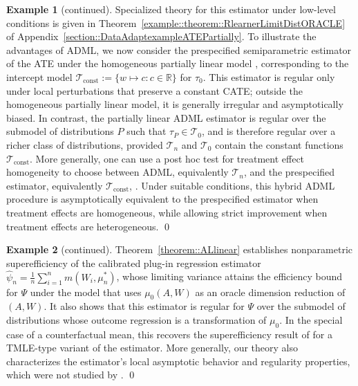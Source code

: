 \documentclass[11pt]{article}
\theoremstyle{definition}
\newtheorem{example}{Example}
\begin{document}
\begin{example}[continued]
 



Specialized theory for this estimator under low-level conditions is given in Theorem~\ref{example::theorem::RlearnerLimitDistORACLE} of Appendix~\ref{section::DataAdaptexampleATEPartially}. To illustrate the advantages of ADML, we now consider the prespecified semiparametric estimator of the ATE under the homogeneous partially linear model \citep{robinson1988root, imbensOverlapEstimand2006, li2019overlapWeights, d2021overlap}, corresponding to the intercept model \(\mathcal{T}_{\mathrm{const}} := \{w \mapsto c : c \in \mathbb{R}\}\) for \(\tau_0\). This estimator is regular only under local perturbations that preserve a constant CATE; outside the homogeneous partially linear model, it is generally irregular and asymptotically biased. In contrast, the partially linear ADML estimator is regular over the submodel of distributions \(P\) such that \(\tau_P \in \mathcal{T}_0\), and is therefore regular over a richer class of distributions, provided \(\mathcal{T}_n\) and \(\mathcal{T}_0\) contain the constant functions \(\mathcal{T}_{\mathrm{const}}\). More generally, one can use a post hoc test for treatment effect homogeneity to choose between ADML, equivalently \(\mathcal{T}_n\), and the prespecified estimator, equivalently \(\mathcal{T}_{\mathrm{const}}\), \citep{crump2008nonparametric, dukes2024nonparametric}. Under suitable conditions, this hybrid ADML procedure is asymptotically equivalent to the prespecified estimator when treatment effects are homogeneous, while allowing strict improvement when treatment effects are heterogeneous. \qed
\end{example}

 

 
\begin{example}[continued]
Theorem~\ref{theorem::ALlinear} establishes nonparametric superefficiency of the calibrated plug-in regression estimator \(\widehat{\psi}_n = \frac{1}{n}\sum_{i=1}^n m(W_i, \mu_n^*)\), whose limiting variance attains the efficiency bound for \(\Psi\) under the model that uses \(\mu_0(A,W)\) as an oracle dimension reduction of \((A,W)\). It also shows that this estimator is regular for \(\Psi\) over the submodel of distributions whose outcome regression is a transformation of \(\mu_0\). In the special case of a counterfactual mean, this recovers the superefficiency result of \citet{ATEsupereff} for a TMLE-type variant of the estimator. More generally, our theory also characterizes the estimator's local asymptotic behavior and regularity properties, which were not studied by \citet{ATEsupereff}. \qed
\end{example}
\end{document}
